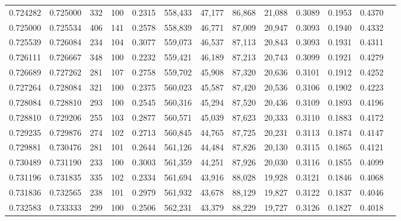 \begin{tabular}{rrrrrrrrrrrrr}
0.724282 & 0.725000 &    332 &   100 &                                     0.2315 & 558,433 &  47,177 &  86,868 &  21,088 & 0.3089 & 0.1953 & 0.4370 \\
0.725000 & 0.725534 &    406 &   141 &                                     0.2578 & 558,839 &  46,771 &  87,009 &  20,947 & 0.3093 & 0.1940 & 0.4332 \\
0.725539 & 0.726084 &    234 &   104 &                                     0.3077 & 559,073 &  46,537 &  87,113 &  20,843 & 0.3093 & 0.1931 & 0.4311 \\
0.726111 & 0.726667 &    348 &   100 &                                     0.2232 & 559,421 &  46,189 &  87,213 &  20,743 & 0.3099 & 0.1921 & 0.4279 \\
0.726689 & 0.727262 &    281 &   107 &                                     0.2758 & 559,702 &  45,908 &  87,320 &  20,636 & 0.3101 & 0.1912 & 0.4252 \\
0.727264 & 0.728084 &    321 &   100 &                                     0.2375 & 560,023 &  45,587 &  87,420 &  20,536 & 0.3106 & 0.1902 & 0.4223 \\
0.728084 & 0.728810 &    293 &   100 &                                     0.2545 & 560,316 &  45,294 &  87,520 &  20,436 & 0.3109 & 0.1893 & 0.4196 \\
0.728810 & 0.729206 &    255 &   103 &                                     0.2877 & 560,571 &  45,039 &  87,623 &  20,333 & 0.3110 & 0.1883 & 0.4172 \\
0.729235 & 0.729876 &    274 &   102 &                                     0.2713 & 560,845 &  44,765 &  87,725 &  20,231 & 0.3113 & 0.1874 & 0.4147 \\
0.729881 & 0.730476 &    281 &   101 &                                     0.2644 & 561,126 &  44,484 &  87,826 &  20,130 & 0.3115 & 0.1865 & 0.4121 \\
0.730489 & 0.731190 &    233 &   100 &                                     0.3003 & 561,359 &  44,251 &  87,926 &  20,030 & 0.3116 & 0.1855 & 0.4099 \\
0.731196 & 0.731835 &    335 &   102 &                                     0.2334 & 561,694 &  43,916 &  88,028 &  19,928 & 0.3121 & 0.1846 & 0.4068 \\
0.731836 & 0.732565 &    238 &   101 &                                     0.2979 & 561,932 &  43,678 &  88,129 &  19,827 & 0.3122 & 0.1837 & 0.4046 \\
0.732583 & 0.733333 &    299 &   100 &                                     0.2506 & 562,231 &  43,379 &  88,229 &  19,727 & 0.3126 & 0.1827 & 0.4018 \\

\end{tabular}

